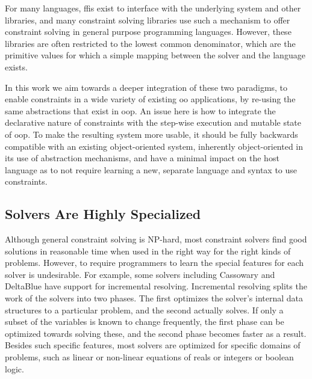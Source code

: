 For many languages, \glspl{ffi} exist to interface with the underlying system
and other libraries, and many constraint solving libraries use such a mechanism
to offer constraint solving in general purpose programming languages. However,
these libraries are often restricted to the lowest common denominator, which are
the primitive values for which a simple mapping between the solver and the
language exists.

In this work we aim towards a deeper integration of these two
paradigms, to enable constraints in a wide variety of existing \ac{oo}
applications, by re-using the same abstractions that exist in
\ac{oop}. An issue here is how to integrate the declarative nature of
constraints with the step-wise execution and mutable state of
\ac{oop}. To make the resulting system more usable, it should be fully
backwards compatible with an existing object-oriented system,
inherently object-oriented in its use of abstraction mechanisms, and
have a minimal impact on the host language as to not require learning
a new, separate language and syntax to use constraints.

\subsection*{Solvers Are Highly Specialized}
\label{sec:solvers-are-specific}

Although general constraint solving is NP-hard, most constraint solvers find
good solutions in reasonable time when used in the right way for the right kinds
of problems. However, to require programmers to learn the special features for
each solver is undesirable. For example, some solvers including Cassowary and
DeltaBlue have support for incremental resolving. Incremental resolving splits
the work of the solvers into two phases. The first optimizes the solver's
internal data structures to a particular problem, and the second actually
solves. If only a subset of the variables is known to change frequently, the
first phase can be optimized towards solving these, and the second phase becomes
faster as a result. Besides such specific features, most solvers are optimized
for specific domains of problems, such as linear or non-linear equations of
reals or integers or boolean logic.

